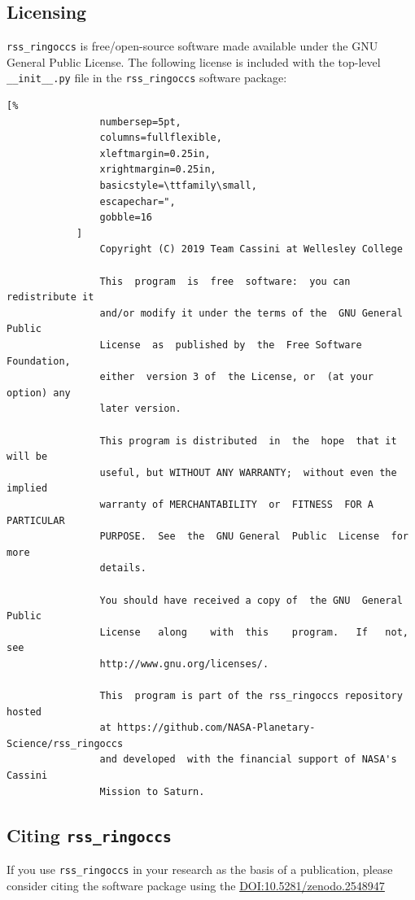 \documentclass[titlepage, 12pt]{article}
\begin{document}
        \subsection{Licensing}
            \texttt{rss\_ringoccs} is free/open-source software made
            available under the GNU General Public License.
            The following license is included with the top-level
            \texttt{\_\_init\_\_.py} file in the
            \texttt{rss\_ringoccs} software package:
            \begin{lstlisting}[%
                numbersep=5pt,
                columns=fullflexible,
                xleftmargin=0.25in,
                xrightmargin=0.25in,
                basicstyle=\ttfamily\small,
                escapechar=",
                gobble=16
            ]
                Copyright (C) 2019 Team Cassini at Wellesley College
                
                This  program  is  free  software:  you can redistribute it
                and/or modify it under the terms of the  GNU General Public
                License  as  published by  the  Free Software   Foundation,
                either  version 3 of  the License, or  (at your option) any
                later version.
                
                This program is distributed  in  the  hope  that it will be
                useful, but WITHOUT ANY WARRANTY;  without even the implied
                warranty of MERCHANTABILITY  or  FITNESS  FOR A  PARTICULAR
                PURPOSE.  See  the  GNU General  Public  License  for  more
                details.
                
                You should have received a copy of  the GNU  General Public
                License   along    with  this    program.   If   not,   see
                http://www.gnu.org/licenses/.
                
                This  program is part of the rss_ringoccs repository hosted
                at https://github.com/NASA-Planetary-Science/rss_ringoccs
                and developed  with the financial support of NASA's Cassini
                Mission to Saturn.
            \end{lstlisting}
        \subsection{Citing \texttt{rss\_ringoccs}}
            If you use \texttt{rss\_ringoccs} in your research
            as the basis of a publication, please consider citing
            the software package using the \href{https://doi.org/10.5281/zenodo.2548947}{DOI:10.5281/zenodo.2548947}
\end{document}
